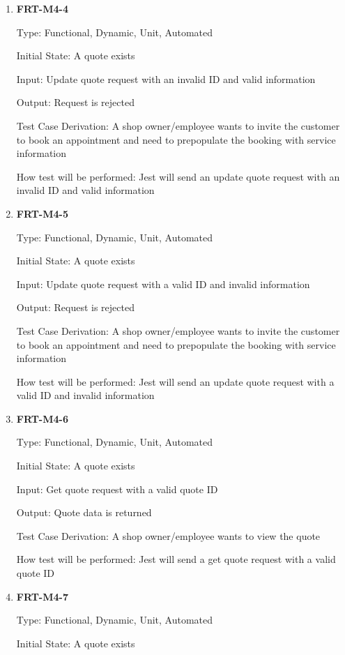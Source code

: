 \documentclass[12pt, titlepage]{article}
\begin{document}
\begin{enumerate}
	\item \textbf{FRT-M4-4}

	      Type: Functional, Dynamic, Unit, Automated

	      Initial State: A quote exists

	      Input: Update quote request with an invalid ID and valid information

	      Output: Request is rejected

	      Test Case Derivation: A shop owner/employee wants to invite the customer to book an appointment and
	      need to prepopulate the booking with service information

	      How test will be performed: Jest will send an update quote request with an invalid ID and valid
	      information

	\item \textbf{FRT-M4-5}

	      Type: Functional, Dynamic, Unit, Automated

	      Initial State: A quote exists

	      Input: Update quote request with a valid ID and invalid information

	      Output: Request is rejected

	      Test Case Derivation: A shop owner/employee wants to invite the customer to book an appointment and
	      need to prepopulate the booking with service information

	      How test will be performed: Jest will send an update quote request with a valid ID and invalid
	      information

	\item \textbf{FRT-M4-6}

	      Type: Functional, Dynamic, Unit, Automated

	      Initial State: A quote exists

	      Input: Get quote request with a valid quote ID

	      Output: Quote data is returned

	      Test Case Derivation: A shop owner/employee wants to view the quote

	      How test will be performed: Jest will send a get quote request with a valid quote ID

	\item \textbf{FRT-M4-7}

	      Type: Functional, Dynamic, Unit, Automated

	      Initial State: A quote exists


\end{enumerate}
\end{document}
